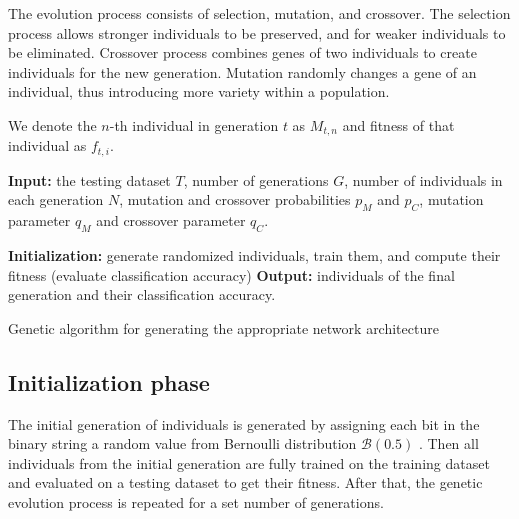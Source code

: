 \documentclass[eng]{simposium}
\begin{document}
The evolution process consists of selection, mutation, and crossover.  
The selection process allows stronger individuals to be preserved, and for weaker individuals to be eliminated. 
Crossover process combines genes of two individuals to create individuals for the new generation. 
Mutation randomly changes a gene of an individual, thus introducing more variety within a population. 

We denote the $n$-th individual in generation $t$ as $M_{t,n}$ and fitness of that individual as $f_{t,i}$. 

\begin{algorithm}[H] 
  \SetAlgoLined 
  \textbf{Input:} the testing dataset $T$, number of generations $G$, number of individuals in each generation $N$, 
  mutation and crossover probabilities $p_M$ and $p_C$, mutation parameter $q_M$ and crossover parameter $q_C$. 

  \textbf{Initialization:} generate randomized individuals, train them, and compute their fitness (evaluate classification accuracy)\; 
    \textbf{Output:} individuals of the final generation and their classification accuracy. 
    \caption{Genetic algorithm for generating the appropriate network architecture} 
\end{algorithm} 

\subsection{Initialization phase} 

The initial generation of individuals is generated by assigning each bit in the binary string a random value from Bernoulli distribution $\mathcal{B}(0.5)$ \cite{4}. 
Then all individuals from the initial generation are fully trained on the training dataset and evaluated on a testing dataset to get their fitness. 
After that, the genetic evolution process is repeated for a set number of generations. 
\end{document}
